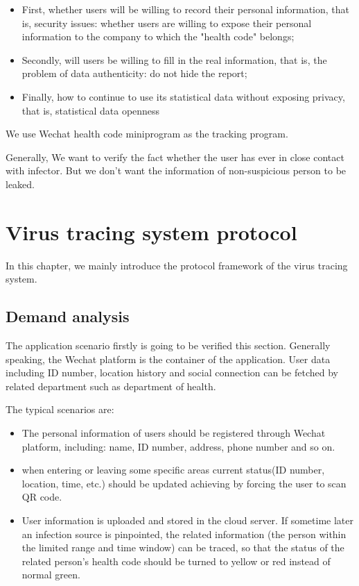 \documentclass[11pt,en]{elegantpaper}
\begin{document}
\begin{itemize}
	\item First, whether users will be willing to record their personal information, that is, security issues: whether users are willing to expose their personal information to the company to which the "health code" belongs;
	\item Secondly, will users be willing to fill in the real information, that is, the problem of data authenticity: do not hide the report;
	\item Finally, how to continue to use its statistical data without exposing privacy, that is, statistical data openness
\end{itemize}

We use Wechat health code miniprogram as the tracking program.

Generally, We want to verify the fact whether the user has ever in close contact with infector. But we don't want the information of non-suspicious person to be leaked. 

\section{Virus tracing system protocol}
In this chapter, we mainly introduce the protocol framework of the virus tracing system.

\subsection{Demand analysis}
The application scenario firstly is going to be verified this section. Generally speaking, the Wechat platform is the container of the application. User data including ID number, location history and social connection can be fetched by related department such as department of health.

The typical scenarios are:
\begin{itemize}
	\item The personal information of users should be registered through Wechat platform, including: name, ID number, address, phone number and so on.
	\item when entering or leaving some specific areas current status(ID number, location, time, etc.) should be updated achieving by forcing the user to scan QR code.
	\item User information is uploaded and stored in the cloud server. If sometime later an infection source is pinpointed, the related information (the person within the limited range and time window) can be traced, so that the status of the related person’s health code should be turned to yellow or red instead of normal green.
\end{itemize}
\end{document}
